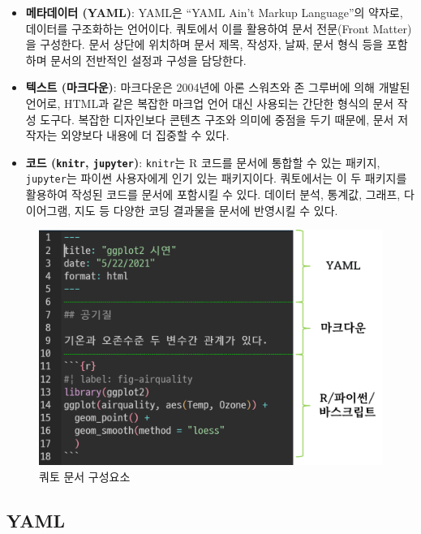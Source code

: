 \documentclass[
  letterpaper,
]{book}
\providecommand{\tightlist}{%
  \setlength{\itemsep}{0pt}\setlength{\parskip}{0pt}}\usepackage{longtable,booktabs,array}
\begin{document}
\begin{itemize}
\tightlist
\item
  \textbf{메타데이터 (YAML)}: YAML은 ``YAML Ain't Markup Language''의
  약자로, 데이터를 구조화하는 언어이다. 쿼토에서 이를 활용하여 문서
  전문(Front Matter)을 구성한다. 문서 상단에 위치하며 문서 제목, 작성자,
  날짜, 문서 형식 등을 포함하며 문서의 전반적인 설정과 구성을 담당한다.
\item
  \textbf{텍스트 (마크다운)}: 마크다운은 2004년에 아론 스워츠와 존
  그루버에 의해 개발된 언어로, HTML과 같은 복잡한 마크업 언어 대신
  사용되는 간단한 형식의 문서 작성 도구다. 복잡한 디자인보다 콘텐츠
  구조와 의미에 중점을 두기 때문에, 문서 저작자는 외양보다 내용에 더
  집중할 수 있다.
\item
  \textbf{코드 (\texttt{knitr}, \texttt{jupyter})}: \texttt{knitr}는 R
  코드를 문서에 통합할 수 있는 패키지, \texttt{jupyter}는 파이썬
  사용자에게 인기 있는 패키지이다. 쿼토에서는 이 두 패키지를 활용하여
  작성된 코드를 문서에 포함시킬 수 있다. 데이터 분석, 통계값, 그래프,
  다이어그램, 지도 등 다양한 코딩 결과물을 문서에 반영시킬 수 있다.
\end{itemize}

\begin{figure}

{\centering \includegraphics[width=4.6875in,height=\textheight]{images/quarto-anatomy.png}

}

\caption{쿼토 문서 구성요소}

\end{figure}

\hypertarget{yaml}{%
\subsection{YAML}\label{yaml}}
\end{document}

